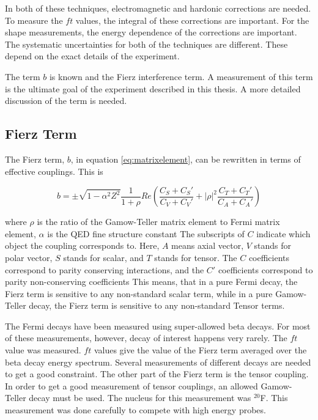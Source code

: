 \documentclass[../MaxHughesThesis.tex]{subfiles}
\begin{document}
In both of these techniques, electromagnetic and hardonic corrections are needed.
To measure the $ft$ values, the integral of these corrections are important.
For the shape measurements, the energy dependence of the corrections are important.
The systematic uncertainties for both of the techniques are different.
These depend on the exact details of the experiment.

The term $b$ is known and the Fierz interference term.
A measurement of this term is the ultimate goal of the experiment described in this thesis.
A more detailed discussion of the term is needed.

\subsection{Fierz Term}
The Fierz term, $b$, in equation \ref{eq:matrixelement}, can be rewritten in terms of effective couplings.
This is %

\begin{equation}
	b =  \pm \sqrt{1 - \alpha^{2}{Z^{2}}}\frac{1}{1 + \rho}Re(\frac{C_{S} + C_{S}'}{C_{V} + C_{V}'} + |\rho|^{2}\frac{C_{T} + C_{T}'}{C_{A} + C_{A}'})
	\label{eq:bwrittenout}
\end{equation}

where $\rho$ is the ratio of the Gamow-Teller matrix element to Fermi matrix element, $\alpha$ is the QED fine structure constant \cite{Gon19}
The subscripts of $C$ indicate which object the coupling corresponds to. 
Here, $A$ means axial vector, $V$ stands for polar vector, $S$ stands for scalar, and $T$ stands for tensor. 
The $C$ coefficients correspond to parity conserving interactions, and the $C'$ coefficients correspond to parity non-conserving coefficients \cite{Lee56}
This means, that in a pure Fermi decay, the Fierz term is sensitive to any non-standard scalar term, while in a pure Gamow-Teller decay, the Fierz term is sensitive to any non-standard Tensor terms. 

The Fermi decays have been measured using super-allowed beta decays.
For most of these measurements, however, decay of interest happens very rarely.
The $ft$ value was measured.
$ft$ values give the value of the Fierz term averaged over the beta decay energy spectrum.
Several measurements of different decays are needed to get a good constraint.
The other part of the Fierz term is the tensor coupling. 
In order to get a good measurement of  tensor couplings, an allowed Gamow-Teller decay must be used. 
The nucleus for this measurement was $^{20}$F.
This measurement was done carefully to compete with high energy probes.
\end{document}
